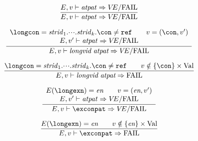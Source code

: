 %
%

\begin{equation}	%
\frac{\E,\V\ts\atpat\ra \VE/\fail}
     {\E,\V\ts\atpat\ra \VE/\fail}\index{56.3}
\end{equation}


\begin{equation}	%
\frac{\begin{array}{c}
       \longcon=\strid_1.\cdots.\strid_k.\con\neq\REF\qquad
      \V=(\con,\V')\\
      \E,\V'\ts\atpat\ra\VE/\fail
      \end{array}}
     {\E,\V\ts\conpat\ra \VE/\fail}
\end{equation}

\begin{equation}	%
\label{conpat-dyn-rule2}
\frac{\longcon=\strid_1.\cdots.\strid_k.\con\neq\REF\qquad
      \V\notin\{\con\}\times\Val}
     {\E,\V\ts\conpat\ra \FAIL}
\end{equation}


\begin{equation}        %
\frac{\begin{array}{c}
      \E(\longexn)=\e\qquad\V=(\e,\V')\\
      \E,\V'\ts\atpat\ra\VE/\FAIL
      \end{array}
     }
     {\E,\V\ts\exconpat\ra\VE/\FAIL}
\end{equation}

\begin{equation} 
\label{exconpat-dyn-rule2}
\frac{\E(\longexn)=\e\qquad\V\notin\{\e\}\times\Val}
     {\E,\V\ts\exconpat\ra\FAIL}
\end{equation}


